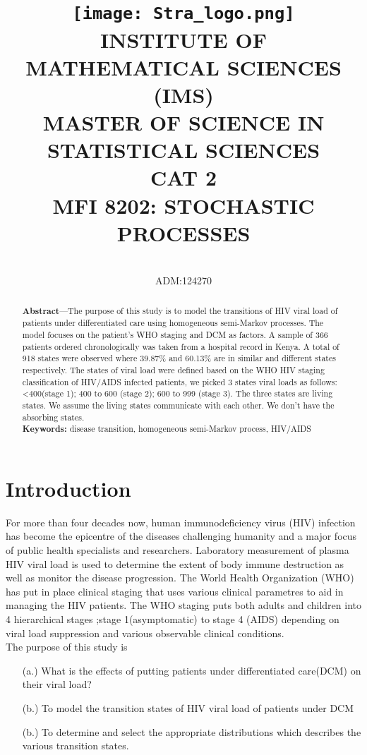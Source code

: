 \documentclass[11pt,a4paper]{article}
\title{\texttt{[image: Stra\_logo.png]}\\
	INSTITUTE OF MATHEMATICAL SCIENCES (IMS)\\ MASTER OF SCIENCE IN STATISTICAL SCIENCES\\
	CAT 2\\ MFI 8202: STOCHASTIC PROCESSES}
\author{\text{Laban Bore} \\ADM:124270}
\begin{document}

  	\maketitle



\newpage

\begin{abstract}
\noindent\textbf{Abstract}—The purpose of this study is to model the transitions of HIV viral load of patients under differentiated care using homogeneous semi-Markov processes. The model focuses on the patient’s WHO staging and DCM as factors. A sample of 366 patients ordered chronologically  was taken from a hospital record in Kenya.  A total of 918 states were observed where 39.87\% and 60.13\% are in similar and different states respectively. The states of viral load were defined based on the WHO HIV staging classification of HIV/AIDS infected patients, we picked 3 states viral loads as follows: <400(stage 1); 400 to 600 (stage 2); 600 to 999 (stage 3). The three states are living states. We assume the living states communicate with each other. We don’t have the absorbing states.\\

\textbf{Keywords:} disease transition, homogeneous semi-Markov process, HIV/AIDS

\end{abstract}


\section{Introduction}
For more than four decades now, human immunodeficiency virus (HIV) infection has become the epicentre of the diseases challenging humanity and a major focus of public health specialists and researchers. Laboratory measurement of plasma HIV viral load is used to determine the extent of body immune destruction as well as monitor the disease progression. The World Health Organization (WHO) has put in place clinical staging that uses various clinical parametres to aid in managing the HIV patients. The WHO staging puts both adults and children into 4 hierarchical stages ;stage 1(asymptomatic) to stage 4 (AIDS) depending on viral load suppression and various observable clinical conditions.\\

The purpose of this study is
\begin{enumerate}
    \item[(a.)] What is the effects of putting patients under differentiated care(DCM) on their viral load?
    \item[(b.)] To model the transition states of HIV viral load of patients under DCM
    \item[(b.)] To determine and select the appropriate distributions which describes the various transition states.

\end{enumerate}
\end{document}
